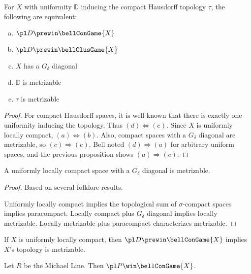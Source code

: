 \begin{cor}
  For $X$ with uniformity $\mathbb{D}$ inducing the compact Hausdorff topology
  $\tau$, the following are equivalent:
    \begin{enumerate}[(a)]
      \item $\pl D \prewin \bellConGame{X}$
      \item $\pl D \prewin \bellClusGame{X}$
      \item $X$ has a $G_\delta$ diagonal
      \item $\mathbb{D}$ is metrizable
      \item $\tau$ is metrizable
    \end{enumerate}
\end{cor}

\begin{proof}
  For compact Hausdorff spaces, it is well known that there is exactly one
  uniformity inducing the topology. Thus $(d)\Leftrightarrow(e)$. Since $X$
  is uniformly locally compact, $(a)\Leftrightarrow(b)$. Also, compact spaces
  with a $G_\delta$ diagonal are metrizable, so $(c)\Rightarrow(e)$.
  Bell noted $(d)\Rightarrow(a)$
  for arbitrary uniform spaces, and the previous proposition shows
  $(a)\Rightarrow(c)$.
\end{proof}

\begin{thm}
  A uniformly locally compact space with a $G_\delta$ diagonal is metrizable.
\end{thm}

\begin{proof}
  Based on several folklore results.

  Uniformly locally compact implies the topological sum of $\sigma$-compact
  spaces implies paracompact. Locally compact plus $G_\delta$ diagonal implies
  locally metrizable. Locally metrizable plus paracompact characterizes
  metrizable.
\end{proof}

\begin{cor}
  If $X$ is uniformly locally compact, then $\pl D \prewin \bellConGame{X}$
  implies $X$'s topology is metrizable.
\end{cor}





\newpage

\begin{ex}
  Let $R$ be the Michael Line. Then $\pl P\win \bellConGame{X}$.
\end{ex}

